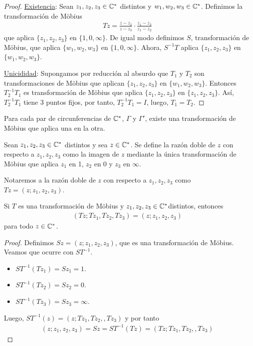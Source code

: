 \begin{proof}
    \underline{Existencia}:
    Sean $z_1,z_2,z_3 \in \mathbb{C}^*$ distintos y $w_1,w_2,w_3 \in \mathbb{C}^*$. Definimos la transformación de M\"obius
    \begin{align*}
        Tz = \frac{z - z_2}{z - z_3} \cdot \frac{z_1 - z_3}{z_1 - z_2}
    \end{align*}
    que aplica $\{z_1,z_2,z_3\}$ en $\{1,0,\infty\}$. De igual modo definimos $S$, transformación de M\"obius, que aplica $\{w_1,w_2,w_3\}$ en $\{1,0,\infty\}$. Ahora, $S^{-1}T$ aplica $\{z_1,z_2,z_3\}$ en $\{w_1,w_2,w_3\}$.

    \underline{Unicididad}: Supongamos por reducción al absurdo que $T_1$ y $T_2$ son transformaciones de M\"obius que aplican $\{z_1,z_2,z_3\}$ en $\{w_1,w_2,w_3\}$. Entonces $T_2^{-1}T_1$ es transformación de M\"obius que aplica $\{z_1,z_2,z_3\}$ en $\{z_1,z_2,z_3\}$. Así, $T_2^{-1}T_1$ tiene 3 puntos fijos, por tanto, $T_2^{-1}T_1 = I$, luego, $T_1 = T_2$.
\end{proof}

\begin{cor}
    Para cada par de circunferencias de $\mathbb{C}^*$, $\Gamma$ y $\Gamma'$, existe una transformación de M\"obius que aplica una en la otra.
\end{cor}

\begin{defi}
    Sean $z_1,z_2,z_3 \in \mathbb{C}^*$ distintos y sea $z \in \mathbb{C}^*$. Se define la razón doble de $z$ con respecto a $z_1,z_2,z_3$ como la imagen de $z$ mediante la única transformación de M\"obius que aplica $z_1$ en 1, $z_2$ en 0 y $z_3$ en $\infty$.
\end{defi}
Notaremos a la razón doble de $z$ con respecto a $z_1,z_2,z_3$ como $Tz = (z;z_1,z_2,z_3)$.

\begin{prop}
    Si $T$ es una transformación de M\"obius y $z_1,z_2,z_3 \in \mathbb{C}^*$distintos, entonces
    \begin{align*}
        (Tz;Tz_1,Tz_2,Tz_3) = (z;z_1,z_2,z_3)
    \end{align*}
    para todo $z \in \mathbb{C}^*$.
\end{prop}

\begin{proof}
    Definimos $Sz = (z;z_1,z_2,z_3)$, que es una transformación de M\"obius. Veamos que ocurre con $ST^{-1}$.
    \begin{itemize}
        \item $ST^{-1}(Tz_1) = Sz_1 = 1$.
        \item $ST^{-1}(Tz_2) = Sz_2 = 0$.
        \item $ST^{-1}(Tz_3) = Sz_3 = \infty$.
    \end{itemize}
    Luego, $ST^{-1}(z) = (z;Tz_1,Tz_2,,Tz_3)$ y por tanto
    \begin{align*}
        (z;z_1,z_2,z_3) = Sz = ST^{-1}(Tz) = (Tz;Tz_1,Tz_2,,Tz_3)
    \end{align*}
\end{proof}

